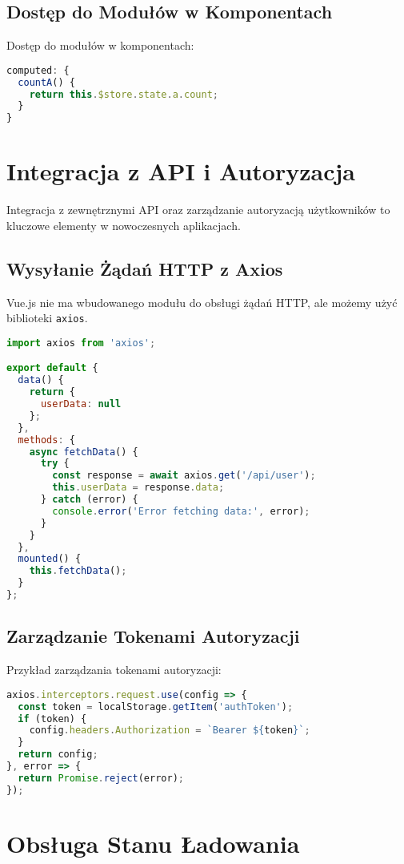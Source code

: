 \documentclass[a4paper,12pt]{article}
\begin{document}
\subsection{Dostęp do Modułów w Komponentach}
Dostęp do modułów w komponentach:

\begin{lstlisting}[language=JavaScript]
computed: {
  countA() {
    return this.$store.state.a.count;
  }
}
\end{lstlisting}

\section{Integracja z API i Autoryzacja}
Integracja z zewnętrznymi API oraz zarządzanie autoryzacją użytkowników to kluczowe elementy w nowoczesnych aplikacjach.

\subsection{Wysyłanie Żądań HTTP z Axios}
Vue.js nie ma wbudowanego modułu do obsługi żądań HTTP, ale możemy użyć biblioteki \texttt{axios}.

\begin{lstlisting}[language=JavaScript]
import axios from 'axios';

export default {
  data() {
    return {
      userData: null
    };
  },
  methods: {
    async fetchData() {
      try {
        const response = await axios.get('/api/user');
        this.userData = response.data;
      } catch (error) {
        console.error('Error fetching data:', error);
      }
    }
  },
  mounted() {
    this.fetchData();
  }
};
\end{lstlisting}

\subsection{Zarządzanie Tokenami Autoryzacji}
Przykład zarządzania tokenami autoryzacji:

\begin{lstlisting}[language=JavaScript]
axios.interceptors.request.use(config => {
  const token = localStorage.getItem('authToken');
  if (token) {
    config.headers.Authorization = `Bearer ${token}`;
  }
  return config;
}, error => {
  return Promise.reject(error);
});
\end{lstlisting}

\section{Obsługa Stanu Ładowania}
\end{document}
